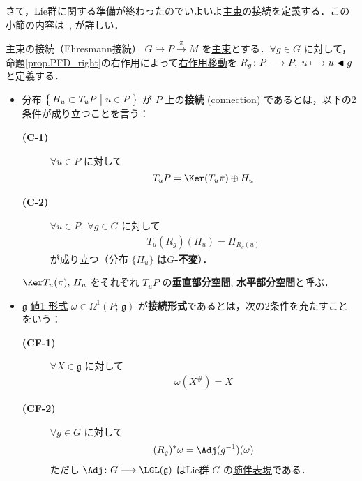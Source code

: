 \documentclass[TQFT_main]{subfiles}
\begin{document}
さて，Lie群に関する準備が終わったのでいよいよ\hyperref[def.PFD]{主束}の接続を定義する．この小節の内容は~\cite[第6章]{Imai2013diff}, \cite[\S 28]{Tu2017differential}が詳しい．


\begin{mydef}[label=def:connection,breakable]{主束の接続（Ehresmann接続）}
    $G \hookrightarrow P \xrightarrow{\pi} M$ を\hyperref[def.PFD]{主束}とする．$\forall g \in G$ に対して，命題\ref{prop.PFD_right}の右作用によって\hyperref[def:fundamental-vecf]{右作用移動}を $R_g \colon P \longrightarrow P,\; u \longmapsto u \blacktriangleleft g$ と定義する．
    \begin{itemize}
        \item 分布 $\bigl\{\, H_u \subset T_u P \bigm| u \in P \,\bigr\}$ が $P$ 上の\textbf{接続} (connection) であるとは，以下の2条件が成り立つことを言う：
        \begin{description}
            \item[\textbf{(C-1)}]  $\forall u \in P$ に対して
            \begin{align}
                T_u P = \Ker (T_u \pi) \oplus H_u
            \end{align}
            \item[\textbf{(C-2)}] $\forall u \in P,\; \forall g \in G$ に対して
            \begin{align}
                T_u(R_g) (H_u) = H_{R_g(u)}
            \end{align}
            が成り立つ（分布 $\{H_u\}$ は\textbf{$G$-不変}）．
        \end{description}
        $\Ker T_u (\pi),\, H_u$ をそれぞれ $T_u P$ の\textbf{垂直部分空間}, \textbf{水平部分空間}と呼ぶ．
        \item $\mathfrak{g}$ \hyperref[eq:E-valued]{値1-形式} $\omega \in \Omega^1(P;\, \mathfrak{g})$ が\textbf{接続形式}であるとは，次の2条件を充たすことをいう：
        \begin{description}
            \item[\textbf{(CF-1)}] $\forall X \in \mathfrak{g}$ に対して
            \begin{align}
                \omega(X^\#) = X
            \end{align}
            \item[\textbf{(CF-2)}] $\forall g \in G$ に対して
            \begin{align}
                (R_g)^* \omega = \Adj (g^{-1})(\omega)
            \end{align}
            ただし $\Adj \colon G \lto \LGL (\mathfrak{g})$ はLie群 $G$ の\hyperref[def:Lie-adj]{随伴表現}である．
        \end{description}
    \end{itemize}
    
\end{mydef}
\end{document}
